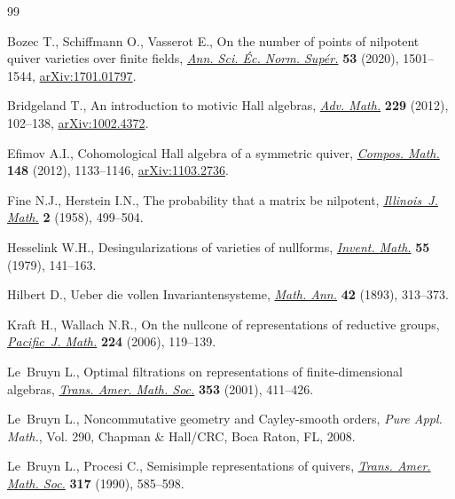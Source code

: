 \begin{thebibliography}{99}
\footnotesize\itemsep=0pt

Bozec T., Schiffmann O., Vasserot E., On the number of points of nilpotent
 quiver varieties over finite fields,
 \href{https://doi.org/10.24033/asens.2452}{\textit{Ann. Sci. \'Ec. Norm.
 Sup\'er.}} \textbf{53} (2020), 1501--1544,
 \href{http://arxiv.org/abs/1701.01797}{arXiv:1701.01797}.

Bridgeland T., An introduction to motivic {H}all algebras,
 \href{https://doi.org/10.1016/j.aim.2011.09.003}{\textit{Adv. Math.}}
 \textbf{229} (2012), 102--138,
 \href{http://arxiv.org/abs/1002.4372}{arXiv:1002.4372}.

Efimov A.I., Cohomological {H}all algebra of a symmetric quiver,
 \href{https://doi.org/10.1112/S0010437X12000152}{\textit{Compos. Math.}}
 \textbf{148} (2012), 1133--1146,
 \href{http://arxiv.org/abs/1103.2736}{arXiv:1103.2736}.

Fine N.J., Herstein I.N., The probability that a matrix be nilpotent,
 \href{https://doi.org/10.1215/ijm/1255454112}{\textit{Illinois~J. Math.}}
 \textbf{2} (1958), 499--504.

Hesselink W.H., Desingularizations of varieties of nullforms,
 \href{https://doi.org/10.1007/BF01390087}{\textit{Invent. Math.}} \textbf{55}
 (1979), 141--163.

Hilbert D., Ueber die vollen {I}nvariantensysteme,
 \href{https://doi.org/10.1007/BF01444162}{\textit{Math. Ann.}} \textbf{42}
 (1893), 313--373.

Kraft H., Wallach N.R., On the nullcone of representations of reductive groups,
 \href{https://doi.org/10.2140/pjm.2006.224.119}{\textit{Pacific~J. Math.}}
 \textbf{224} (2006), 119--139.

Le~Bruyn L., Optimal filtrations on representations of finite-dimensional
 algebras, \href{https://doi.org/10.1090/S0002-9947-00-02590-3}{\textit{Trans.
 Amer. Math. Soc.}} \textbf{353} (2001), 411--426.

Le~Bruyn L., Noncommutative geometry and {C}ayley-smooth orders, \textit{Pure
 Appl. Math.}, Vol. 290, Chapman \& Hall/CRC, Boca Raton, FL, 2008.

Le~Bruyn L., Procesi C., Semisimple representations of quivers,
 \href{https://doi.org/10.2307/2001477}{\textit{Trans. Amer. Math. Soc.}}
 \textbf{317} (1990), 585--598.


\end{thebibliography}
